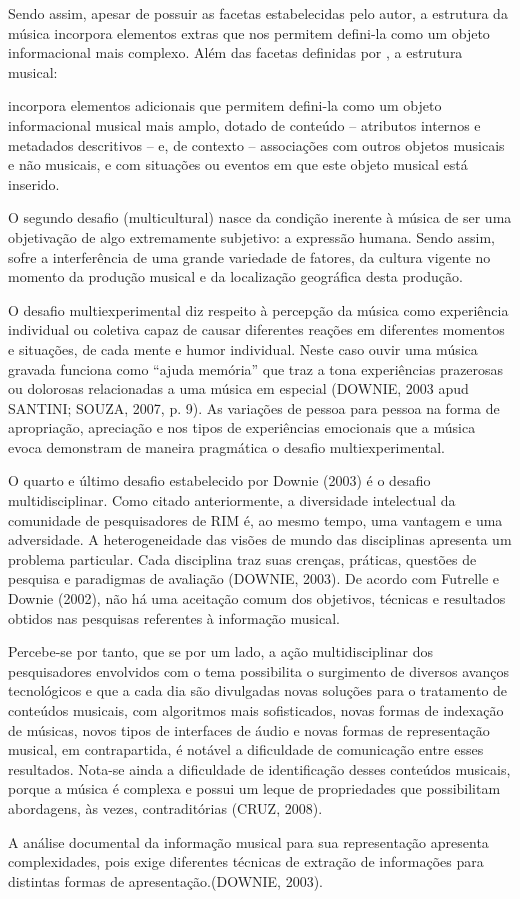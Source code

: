Sendo assim, apesar de possuir as facetas estabelecidas pelo autor, a estrutura da música incorpora elementos extras que nos permitem defini-la como um objeto informacional mais complexo. Além das facetas definidas por  , a estrutura musical:

\begin{citacao}
    [...] incorpora elementos adicionais que permitem defini-la como um objeto informacional musical mais amplo, dotado de conteúdo – atributos internos e metadados descritivos – e, de contexto – associações com outros objetos musicais e não musicais, e com situações ou eventos em que este objeto musical está inserido.
\end{citacao}

O segundo desafio (multicultural) nasce da condição inerente à música de ser uma objetivação de algo extremamente subjetivo: a expressão humana. Sendo assim, sofre a interferência de uma grande variedade de fatores, da cultura vigente no momento da produção musical e da localização geográfica desta produção.

O desafio multiexperimental diz respeito à percepção da música como experiência individual ou coletiva capaz de causar diferentes reações em diferentes momentos e situações, de cada mente e humor individual. Neste caso ouvir uma música gravada funciona como “ajuda memória” que traz a tona experiências prazerosas ou dolorosas relacionadas a uma música em especial (DOWNIE, 2003 apud SANTINI; SOUZA, 2007, p. 9). As variações de pessoa para pessoa na forma de apropriação, apreciação e nos tipos de experiências emocionais que a música evoca demonstram de maneira pragmática o desafio multiexperimental.

O quarto e último desafio estabelecido por Downie (2003) é o desafio multidisciplinar. Como citado anteriormente, a diversidade intelectual da comunidade de pesquisadores de RIM é, ao mesmo tempo, uma vantagem e uma adversidade. A heterogeneidade das visões de mundo das disciplinas apresenta um problema particular. Cada disciplina traz suas crenças, práticas, questões de pesquisa e paradigmas de avaliação (DOWNIE, 2003). De acordo com Futrelle e Downie (2002), não há uma aceitação comum dos objetivos, técnicas e resultados obtidos nas pesquisas referentes à informação musical.

Percebe-se por tanto, que se por um lado, a ação multidisciplinar dos pesquisadores envolvidos com o tema possibilita o surgimento de diversos avanços tecnológicos e que a cada dia são divulgadas novas soluções para o tratamento de conteúdos musicais, com algoritmos mais sofisticados, novas formas de indexação de músicas, novos tipos de interfaces de áudio e novas formas de representação musical, em contrapartida, é notável a dificuldade de comunicação entre esses resultados. Nota-se ainda a dificuldade de identificação desses conteúdos musicais, porque a música é complexa e possui um leque de propriedades que possibilitam abordagens, às vezes, contraditórias (CRUZ, 2008).

A análise documental da informação musical para sua representação apresenta complexidades, pois exige diferentes técnicas de extração de informações para distintas formas de apresentação.(DOWNIE, 2003).